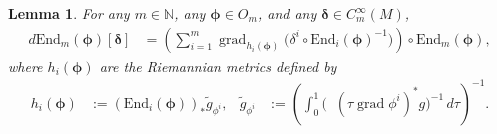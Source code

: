 \documentclass{article}
\newtheorem{lemma}[theorem]{Lemma}
\theoremstyle{remark}
\newcommand{\M}{M}
\newcommand{\CinfV}[1]{C_{#1}^{\infty}(\M)}
\DeclareMathOperator{\grad}{\mathrm{grad}}
\DeclareMathOperator{\expg}{\mathrm{exp}^{\text{$g$}}}
\begin{document}
\begin{lemma}
    For any $m\in\mathbb{N}$, any $\bm{\phi}\in O_m$, and any $\bm{\delta}\in\CinfV{m}$,
    \begin{align*}
        d\mathrm{End}_{m}(\bm{\phi})[\bm{\delta}]&=\left(\sum_{i=1}^{m} \grad_{h_i(\bm{\phi})}\big( \delta^i\circ \mathrm{End}_{i}(\bm{\phi})^{-1}\big)\right)\circ \mathrm{End}_{m}(\bm{\phi}),
    \end{align*}
    where $h_i(\bm{\phi})$ are the Riemannian metrics defined by
    \begin{align*}
        h_i(\bm{\phi})&:=(\mathrm{End}_{i}(\bm{\phi}))_*\tilde{g}_{\phi^i}, & \tilde{g}_{\phi^i} &:= \left(\int_0^1 \big(\expg(\tau \grad \phi^i)^*g\big)^{-1}\,d\tau\right)^{-1}.
    \end{align*}
\end{lemma}
\end{document}

